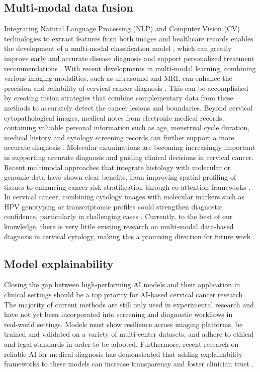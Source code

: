 \documentclass[final,5p,times,twocolumn,authoryear]{elsarticle}
\begin{document}
\subsection{Multi‑modal data fusion}
Integrating Natural Language Processing (NLP) and Computer Vision (CV) technologies to extract features from both images and healthcare records enables the development of a multi‑modal classification model \cite{ref162}, which can greatly improve early and accurate disease diagnosis and support personalized treatment recommendations \cite{ref124,ref125}. With recent developments in multi‑modal learning, combining various imaging modalities, such as ultrasound and MRI, can enhance the precision and reliability of cervical cancer diagnosis \cite{ref119}. This can be accomplished by creating fusion strategies that combine complementary data from these methods to accurately detect the cancer lesions and boundaries. Beyond cervical cytopathological images, medical notes from electronic medical records, containing valuable personal information such as age, menstrual cycle duration, medical history and cytology screening records can further support a more accurate diagnosis \cite{ref163}. Molecular examinations are becoming increasingly important in supporting accurate diagnosis and guiding clinical decisions in cervical cancer. Recent multimodal approaches that integrate histology with molecular or genomic data have shown clear benefits, from improving spatial profiling of tissues \cite{ref164} to enhancing cancer risk stratification through co‑attention frameworks \cite{ref165}. In cervical cancer, combining cytology images with molecular markers such as HPV genotyping or transcriptomic profiles could strengthen diagnostic confidence, particularly in challenging cases \cite{ref162}. Currently, to the best of our knowledge, there is very little existing research on multi‑modal data‑based diagnosis in cervical cytology, making this a promising direction for future work \cite{ref122,ref150,ref166}.
\subsection{Model explainability}
Closing the gap between high‑performing AI models and their application in clinical settings should be a top priority for AI‑based cervical cancer research \cite{ref167}. The majority of current methods are still only used in experimental research and have not yet been incorporated into screening and diagnostic workflows in real‑world settings. Models must show resilience across imaging platforms, be trained and validated on a variety of multi‑center datasets, and adhere to ethical and legal standards in order to be adopted. Furthermore, recent research on reliable AI for medical diagnosis has demonstrated that adding explainability frameworks to these models can increase transparency and foster clinician trust \cite{ref168}.
\end{document}
